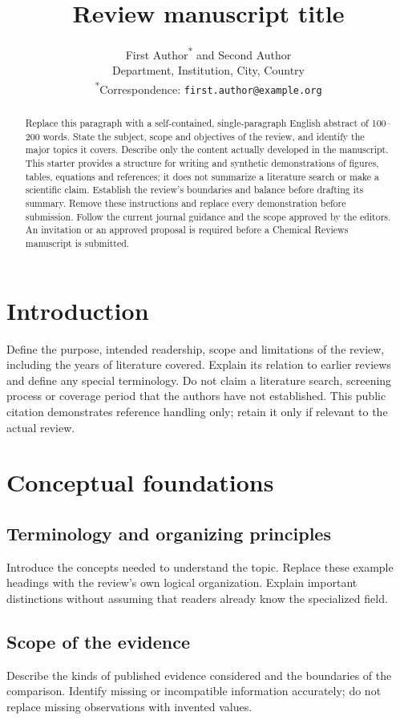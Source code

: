 \documentclass[letterpaper,11pt]{article}
\title{Review manuscript title}
\author{First Author\textsuperscript{*} and Second Author\\
  \small Department, Institution, City, Country\\
  \small \textsuperscript{*}Correspondence: \texttt{first.author@example.org}}
\date{}
\begin{document}
\maketitle
\begin{abstract}
Replace this paragraph with a self-contained, single-paragraph English
abstract of 100--200 words. State the subject, scope and objectives of the
review, and identify the major topics it covers. Describe only the content
actually developed in the manuscript. This starter provides a structure for
writing and synthetic demonstrations of figures, tables, equations and
references; it does not summarize a literature search or make a scientific
claim. Establish the review's boundaries and balance before drafting its
summary. Remove these instructions and replace every demonstration before
submission. Follow the current journal guidance and the scope approved by
the editors. An invitation or an approved proposal is required before a
Chemical Reviews manuscript is submitted.
\end{abstract}

\tableofcontents
\clearpage

\section{Introduction}\label{sec:introduction}
Define the purpose, intended readership, scope and limitations of the review,
including the years of literature covered. Explain its relation to earlier
reviews and define any special terminology. Do not claim a literature search,
screening process or coverage period that the authors have not established.
This public citation demonstrates reference handling only; retain it only if
relevant to the actual review\cite{wilkinson2016fair}.

\section{Conceptual foundations}\label{sec:foundations}
\subsection{Terminology and organizing principles}\label{sec:terminology}
Introduce the concepts needed to understand the topic. Replace these example
headings with the review's own logical organization. Explain important
distinctions without assuming that readers already know the specialized field.

\subsection{Scope of the evidence}\label{sec:evidence}
Describe the kinds of published evidence considered and the boundaries of the
comparison. Identify missing or incompatible information accurately; do not
replace missing observations with invented values.
\end{document}
